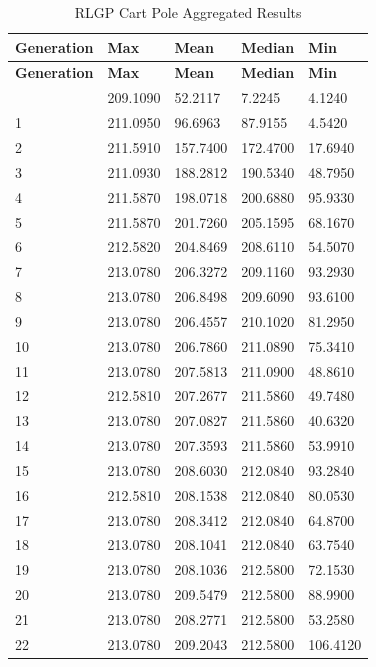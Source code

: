 \begin{longtable}{|l|l|l|l|l|}
\caption{RLGP Cart Pole Aggregated Results}\label{tab:cart-pole-q}\\\hline
\textbf{Generation} & \textbf{Max} & \textbf{Mean} & \textbf{Median} & \textbf{Min} \\\hline
\endfirsthead
\hline
\textbf{Generation} & \textbf{Max} & \textbf{Mean} & \textbf{Median} & \textbf{Min} \\\hline
\endhead
\hline
\endfoot
0 & 209.1090 & 52.2117 & 7.2245 & 4.1240 \\\hline
1 & 211.0950 & 96.6963 & 87.9155 & 4.5420 \\\hline
2 & 211.5910 & 157.7400 & 172.4700 & 17.6940 \\\hline
3 & 211.0930 & 188.2812 & 190.5340 & 48.7950 \\\hline
4 & 211.5870 & 198.0718 & 200.6880 & 95.9330 \\\hline
5 & 211.5870 & 201.7260 & 205.1595 & 68.1670 \\\hline
6 & 212.5820 & 204.8469 & 208.6110 & 54.5070 \\\hline
7 & 213.0780 & 206.3272 & 209.1160 & 93.2930 \\\hline
8 & 213.0780 & 206.8498 & 209.6090 & 93.6100 \\\hline
9 & 213.0780 & 206.4557 & 210.1020 & 81.2950 \\\hline
10 & 213.0780 & 206.7860 & 211.0890 & 75.3410 \\\hline
11 & 213.0780 & 207.5813 & 211.0900 & 48.8610 \\\hline
12 & 212.5810 & 207.2677 & 211.5860 & 49.7480 \\\hline
13 & 213.0780 & 207.0827 & 211.5860 & 40.6320 \\\hline
14 & 213.0780 & 207.3593 & 211.5860 & 53.9910 \\\hline
15 & 213.0780 & 208.6030 & 212.0840 & 93.2840 \\\hline
16 & 212.5810 & 208.1538 & 212.0840 & 80.0530 \\\hline
17 & 213.0780 & 208.3412 & 212.0840 & 64.8700 \\\hline
18 & 213.0780 & 208.1041 & 212.0840 & 63.7540 \\\hline
19 & 213.0780 & 208.1036 & 212.5800 & 72.1530 \\\hline
20 & 213.0780 & 209.5479 & 212.5800 & 88.9900 \\\hline
21 & 213.0780 & 208.2771 & 212.5800 & 53.2580 \\\hline
22 & 213.0780 & 209.2043 & 212.5800 & 106.4120 \\\hline

\end{longtable}
